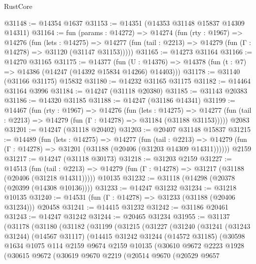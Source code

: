 \begin{lexlean}{RustCore}
\begin{coremodule}
@31148 := @14354 @1637
@31153 := @14351 (@14353 @31148 @15837 @14309 @14311)
@31164 := fun (params : @14272) =>
  @14274
    (fun (rty : @1967) =>
    @14276
      (fun (lets : @14275) =>
      @14277 (fun (tail : @2213) => @14279 (fun (Γ : @14278) => @31120 (@31147 @31153)))))
@31165 := @14273 @31164
@31166 := @14270 @31165
@31175 := @14377
    (fun (U : @14376) => @14378 (fun (t : @7) => @14386 (@14247 (@14392 @15834 @14266) @14403)))
@31178 := @31140 (@31166 @31175) @15832
@31180 := @14232 @31165 @31175
@31182 := @14464 @31164 @3996
@31184 := @14247 (@31118 @20380)
@31185 := @31143 @20383
@31186 := @14320 @31185
@31188 := @14247 (@31186 @14341)
@31199 := @14467
    (fun (rty : @1967) =>
    @14276
      (fun (lets : @14275) =>
      @14277 (fun (tail : @2213) => @14279 (fun (Γ : @14278) => @31184 (@31188 @31153)))))
    @2083
@31201 := @14247 (@31118 @20402)
@31203 := @20407 @31148 @15837
@31215 := @14489
    (fun (lets : @14275) =>
    @14277
      (fun (tail : @2213) =>
      @14279 (fun (Γ : @14278) => @31201 (@31188 (@20406 (@31203 @14309 @14311))))))
    @2159
@31217 := @14247 (@31118 @30173)
@31218 := @31203 @2159
@31227 := @14513
    (fun (tail : @2213) => @14279 (fun (Γ : @14278) => @31217 (@31188 (@20406 (@31218 @14311)))))
    @10135
@31232 := @31118 (@14298 (@20378 (@20399 (@14308 @10136))))
@31233 := @14247 @31232
@31234 := @31218 @10135
@31240 := @14531 (fun (Γ : @14278) => @31233 (@31188 (@20406 @31234))) @20458
@31241 := @14415 @31232
@31242 := @31186 @20461
@31243 := @14247 @31242
@31244 := @20465 @31234
@31955 := @31137
    (@31178
      (@31180
        (@31182
          (@31199
            (@31215
              (@31227
                (@31240
                  (@31241
                    (@31243 @31244)
                    (@14567 @31117)
                    (@14415
                      @31242
                      @31244
                      (@14572 @31185)
                      (@30598
                        @1634
                        @1075
                        @114
                        @2159
                        @9674
                        @2159
                        @10135
                        (@30610
                          @9672
                          @2223
                          @1928
                          (@30615
                            @9672
                            (@30619
                              @9670
                              @2219
                              (@20514
                                @9670
                                (@20529
                                  @9657

\end{coremodule}
\end{lexlean}
